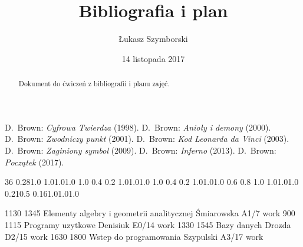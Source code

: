 \documentclass[a4paper,12pt]{article}
\title{Bibliografia i plan}
\author{Łukasz Szymborski}
\date{14 listopada 2017}
\begin{document}
%
\maketitle

\begin{abstract}
Dokument do ćwiczeń z bibliografii i planu zajęć.
\end{abstract}
%
\begin{thebibliography}{99}
\bibitem{} D.~Brown: \textit{Cyfrowa Twierdza} (1998).
\bibitem{} D.~Brown: \textit{Anioły i demony} (2000).
\bibitem{} D.~Brown: \textit{Zwodniczy punkt} (2001).
\bibitem{} D.~Brown: \textit{Kod Leonarda da Vinci} (2003).
\bibitem{} D.~Brown: \textit{Zaginiony symbol} (2009).
\bibitem{} D.~Brown: \textit{Inferno} (2013).
\bibitem{} D.~Brown: \textit{Początek} (2017).
\end{thebibliography}
%
\begin{landscape}
%
\setslotsize{2.8cm}{0.3cm}
 {36}
\settextframe{0.8mm}
%
 {0.28}{1.0} {1.0}{1.0}{1.0}
    {1.0} {0.4} {0.2} {1.0}{1.0}{1.0}
 {1.0} {0.4} {0.2} {1.0}{1.0}{1.0}
   {0.6} {0.8} {1.0} {1.0}{1.0}{1.0}
 {0.21}{0.5} {0.16}{1.0}{1.0}{1.0}
%
\begin{timetable}
 {1130} {1345} {Elementy algebry i geometrii analitycznej} {Śmiarowska} {A1/7} {work}
 {900} {1115} {Programy uzytkowe} {Denisiuk} {E0/14} {work}
 {1330} {1545} {Bazy danych} {Drozda} {D2/15} {work}
 {1630} {1800} {Wstep do programowania} {Szypulski} {A3/17} {work}
%
\end{timetable}
\end{landscape}
\end{document}
